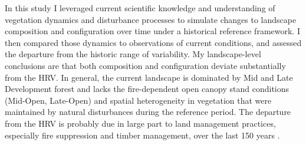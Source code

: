 

In this study I leveraged current scientific knowledge and understanding of vegetation dynamics and disturbance processes to simulate changes to landscape composition and configuration over time under a historical reference framework. I then compared those dynamics to observations of current conditions, and assessed the departure from the historic range of variability. My landscape-level conclusions are that both composition and configuration deviate substantially from the HRV. In general, the current landscape is dominated by Mid and Late Development forest and lacks the fire-dependent open canopy stand conditions (Mid-Open, Late-Open) and spatial heterogeneity in vegetation that were maintained by natural disturbances during the reference period. The departure from the HRV is probably due in large part to land management practices, especially fire suppression and timber management, over the last 150 years \citep{Safford2014,Stephens2007}. 


